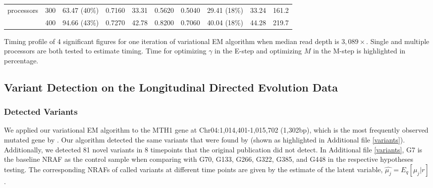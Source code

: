 \documentclass{bmcart}
\begin{document}
\begin{table}[htbp]
\begin{threeparttable}
\begin{tabular}{ccrrrrrrcc}
    processors & 300   & \multicolumn{1}{c}{63.47 (40\%)} & \multicolumn{1}{c}{0.7160} & \multicolumn{1}{c}{33.31} & \multicolumn{1}{c}{0.5620} & \multicolumn{1}{c}{0.5040} & \multicolumn{1}{c}{29.41 (18\%)} & 33.24 & 161.2 \\
          & 400   & \multicolumn{1}{c}{94.66 (43\%)} & \multicolumn{1}{c}{0.7270} & \multicolumn{1}{c}{42.78} & \multicolumn{1}{c}{0.8200} & \multicolumn{1}{c}{0.7060} & \multicolumn{1}{c}{40.04 (18\%)} & 44.28 & 219.7 \\
    \bottomrule
    \end{tabular}%
    \begin{tablenotes}
    \item Timing profile of 4 significant figures for one iteration of variational EM algorithm when median read depth is $3,089\times$.
Single and multiple processors are both tested to estimate timing. Time for optimizing $\gamma$ in the E-step and optimizing $M$ in the M-step is highlighted in percentage.
    \end{tablenotes}
    \end{threeparttable}
\end{table}%



\subsection{Variant Detection on the Longitudinal Directed Evolution Data}
\subsubsection{Detected Variants}
We applied our variational EM algorithm to the MTH1 gene at Chr04:1,014,401-1,015,702 (1,302bp), which is the most frequently observed mutated gene by \cite{kvitek2013whole}.
Our algorithm detected the same variants that were found by \cite{kvitek2013whole} (shown as highlighted in Additional file \ref{variants}).
Additionally, we detected 81 novel variants in 8 timepoints that the original publication did not detect.
In Additional file \ref{variants}, G7 is the baseline NRAF as the control sample when comparing with G70, G133, G266, G322, G385, and G448 in the respective hypotheses testing.
The corresponding NRAFs of called variants at different time points are given by the estimate of the latent variable, $\hat{\mu_j} = E_q[\mu_j|r]$.
\end{document}
